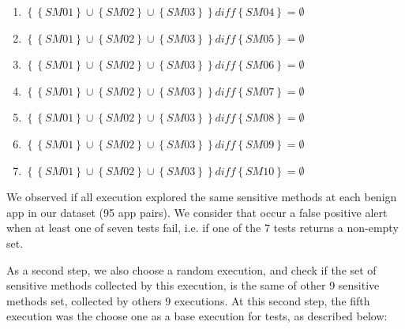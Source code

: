 \begin{enumerate}[(Test 1)]
 \item {$\left\{\left\{SM01\right\} \cup \left\{SM02\right\} \cup \left\{SM03\right\}\right\} \textit{diff} \left\{SM04\right\} = \emptyset$}
 \item {$\left\{\left\{SM01\right\} \cup \left\{SM02\right\} \cup \left\{SM03\right\}\right\} \textit{diff} \left\{SM05\right\} = \emptyset$}
 \item {$\left\{\left\{SM01\right\} \cup \left\{SM02\right\} \cup \left\{SM03\right\}\right\} \textit{diff} \left\{SM06\right\} = \emptyset$}
 \item {$\left\{\left\{SM01\right\} \cup \left\{SM02\right\} \cup \left\{SM03\right\}\right\} \textit{diff} \left\{SM07\right\} = \emptyset$}
 \item {$\left\{\left\{SM01\right\} \cup \left\{SM02\right\} \cup \left\{SM03\right\}\right\} \textit{diff} \left\{SM08\right\} = \emptyset$}
 \item {$\left\{\left\{SM01\right\} \cup \left\{SM02\right\} \cup \left\{SM03\right\}\right\} \textit{diff} \left\{SM09\right\} = \emptyset$}
 \item {$\left\{\left\{SM01\right\} \cup \left\{SM02\right\} \cup \left\{SM03\right\}\right\} \textit{diff} \left\{SM10\right\} = \emptyset$}
 
\end{enumerate}

We observed if all execution explored the same sensitive methods at each benign app in our dataset (95 app pairs). We consider that occur a false positive alert when at least one of seven tests fail, i.e. if one of the 7 tests returns a non-empty set.

As a second step, we also choose a random execution, and check if the set of sensitive methods collected by this execution, is the same of other 9 sensitive methods set, collected by others 9 executions. At this second step, the fifth execution was the choose one as a base execution for tests, as described below:\newline

